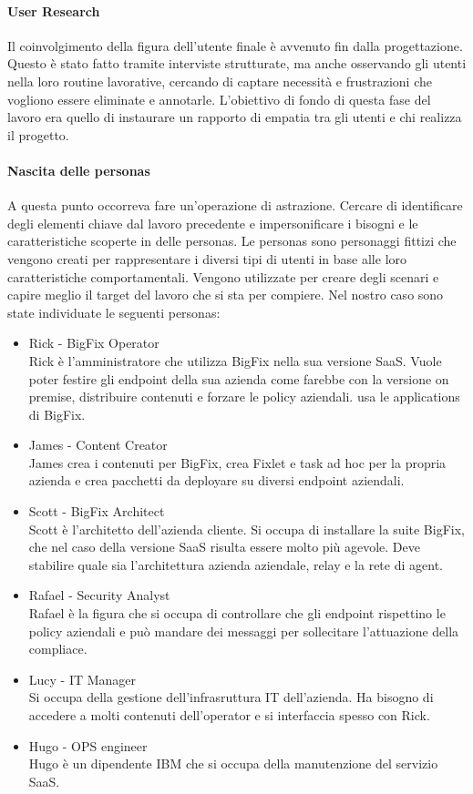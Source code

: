 \paragraph{User Research}
Il coinvolgimento della figura dell'utente finale è avvenuto fin dalla progettazione. Questo è stato fatto tramite interviste strutturate, ma anche osservando gli utenti nella loro routine lavorative, cercando di captare necessità e frustrazioni che vogliono essere eliminate e annotarle. L'obiettivo di fondo di questa fase del lavoro era quello di instaurare un rapporto di empatia tra gli utenti e chi realizza il progetto.

\paragraph{Nascita delle personas}
A questa punto occorreva fare un'operazione di astrazione. Cercare di identificare degli elementi chiave dal lavoro precedente e impersonificare i bisogni e le caratteristiche scoperte in delle personas. Le personas sono personaggi fittizi che vengono creati per rappresentare i diversi tipi di utenti in base alle loro caratteristiche comportamentali. Vengono utilizzate per creare degli scenari e capire meglio il target del lavoro che si sta per compiere. Nel nostro caso sono state individuate le seguenti personas:
\begin{itemize}
	\item Rick - BigFix Operator \\
	Rick è l'amministratore che utilizza BigFix nella sua versione SaaS. Vuole poter festire gli endpoint della sua azienda come farebbe con la versione on premise, distribuire contenuti e forzare le policy aziendali. usa le applications di BigFix.
	\item James - Content Creator \\
	James crea i contenuti per BigFix, crea Fixlet e task ad hoc per la propria azienda e crea pacchetti da deployare su diversi endpoint aziendali.
	\item Scott - BigFix Architect \\
	Scott è l'architetto dell'azienda cliente. Si occupa di installare la suite BigFix, che nel caso della versione SaaS risulta essere molto più agevole. Deve stabilire quale sia l'architettura azienda aziendale, relay e la rete di agent.
	\item  Rafael - Security Analyst \\
	Rafael è la figura che si occupa di controllare che gli endpoint rispettino le policy aziendali e può mandare dei messaggi per sollecitare l'attuazione della compliace.
	\item Lucy - IT Manager \\
	Si occupa della gestione dell'infrasruttura IT dell'azienda. Ha bisogno di accedere a molti contenuti dell'operator e si interfaccia spesso con Rick.
	\item Hugo - OPS engineer \\
	Hugo è un dipendente IBM che si occupa della manutenzione del servizio SaaS.
\end{itemize}


